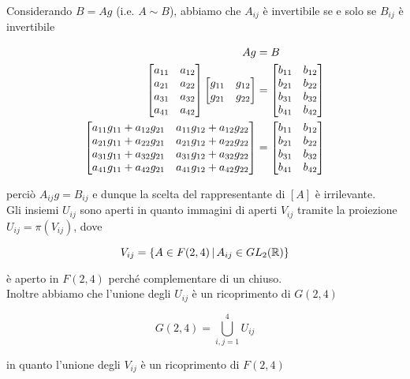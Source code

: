Considerando $ B = A g $ (i.e. $ A \sim B $), abbiamo che $ A_{ij} $ è invertibile se e solo se $ B_{ij} $ è invertibile

\begin{align}
	\begin{split}
		A g &= B \\
		\bmqty{ a_{11} & a_{12} \\ a_{21} & a_{22} \\ a_{31} & a_{32} \\ a_{41} & a_{42} } \bmqty{ g_{11} & g_{12} \\ g_{21} & g_{22} } &= \bmqty{ b_{11} & b_{12} \\ b_{21} & b_{22} \\ b_{31} & b_{32} \\ b_{41} & b_{42} } \\
		\bmqty{ a_{11} g_{11} + a_{12} g_{21} & a_{11} g_{12} + a_{12} g_{22} \\ a_{21} g_{11} + a_{22} g_{21} & a_{21} g_{12} + a_{22} g_{22} \\ a_{31} g_{11} + a_{32} g_{21} & a_{31} g_{12} + a_{32} g_{22} \\ a_{41} g_{11} + a_{42} g_{21} & a_{41} g_{12} + a_{42} g_{22} } &= \bmqty{ b_{11} & b_{12} \\ b_{21} & b_{22} \\ b_{31} & b_{32} \\ b_{41} & b_{42} }
	\end{split}
\end{align}

perciò $ A_{ij} g = B_{ij} $ e dunque la scelta del rappresentante di $ [A] $ è irrilevante. \\
Gli insiemi $ U_{ij} $ sono aperti in quanto immagini di aperti $ V_{ij} $ tramite la proiezione $ U_{ij} = \pi(V_{ij}) $, dove 

\begin{equation}
	V_{ij} = \left\{ A \in F(2,4) \, \middle| \, A_{ij} \in GL_{2}(\mathbb{R}) \right\}
\end{equation}

è aperto in $ F(2,4) $ perché complementare di un chiuso. \\
Inoltre abbiamo che l'unione degli $ U_{ij} $ è un ricoprimento di $ G(2,4) $

\begin{equation}
	G(2,4) = \bigcup_{i,j=1}^{4} U_{ij}
\end{equation}

in quanto l'unione degli $ V_{ij} $ è un ricoprimento di $ F(2,4) $

